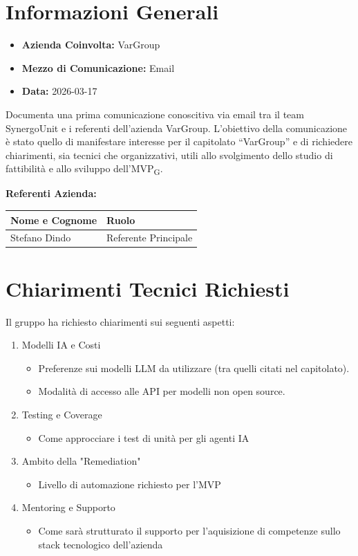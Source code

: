 \section{Informazioni Generali}
\begin{itemize}
	\item \textbf{Azienda Coinvolta:} {VarGroup}
	\item \textbf{Mezzo di Comunicazione:} {Email}
	\item \textbf{Data:} 2026-03-17
\end{itemize}
Documenta una prima comunicazione conoscitiva via email tra il team SynergoUnit e i referenti dell’azienda VarGroup.
L’obiettivo della comunicazione è stato quello di manifestare interesse per il capitolato “VarGroup” e di richiedere chiarimenti, sia tecnici che organizzativi, utili allo svolgimento dello studio di fattibilità e allo sviluppo dell’MVP\textsubscript{G}.

\vspace{0.5cm}
\textbf{Referenti Azienda:}
\begin{table}[ht]
	\centering
	\renewcommand{\arraystretch}{1.2}
	\begin{tabularx}{\textwidth}{X l}
		\toprule
		\textbf{Nome e Cognome} & \textbf{Ruolo} \\
		\midrule
		{Stefano Dindo} & {Referente Principale} \\
		\bottomrule
	\end{tabularx}
\end{table}

\section{Chiarimenti Tecnici Richiesti}
Il gruppo ha richiesto chiarimenti sui seguenti aspetti:
\begin{enumerate}
	\item Modelli IA e Costi
	\begin{itemize}
		\item Preferenze sui modelli LLM da utilizzare (tra quelli citati nel capitolato).
		\item Modalità di accesso alle API per modelli non open source.
	\end{itemize}
	\item Testing e Coverage
	\begin{itemize}
		\item Come approcciare i test di unità per gli agenti IA
	\end{itemize}
	\item Ambito della "Remediation"
	\begin{itemize}
		\item Livello di automazione richiesto per l'MVP
	\end{itemize}
	\item Mentoring e Supporto
	\begin{itemize}
		\item Come sarà strutturato il supporto per l'aquisizione di competenze sullo stack tecnologico dell'azienda
	\end{itemize}
\end{enumerate}


